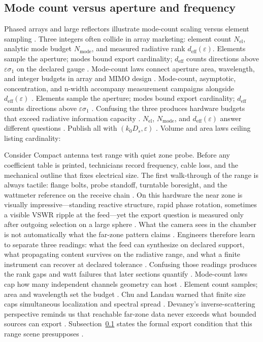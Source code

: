 \subsection{Mode count versus aperture and frequency}
\label{sec:ch481}
Phased arrays and large reflectors illustrate mode-count scaling versus element sampling \cite{collin2001}.
Three integers often collide in array marketing: element count $N_{\mathrm{el}}$, analytic mode budget $N_{\mathrm{mode}}$, and measured radiative rank $d_{\mathrm{eff}}(\varepsilon)$. Elements sample the aperture; modes bound export cardinality; $d_{\mathrm{eff}}$ counts directions above $\varepsilon\sigma_{1}$ on the declared gauge \cite{collin2001}.
Mode-count laws connect aperture area, wavelength, and integer budgets in array and MIMO design \cite{collin2001}.
Mode-count, asymptotic, concentration, and n-width accompany measurement campaigns alongside $d_{\mathrm{eff}}(\varepsilon)$ \cite{landau1962}.
\medskip
 Elements sample the aperture; modes bound export cardinality; \(d_{\mathrm{eff}}\) counts directions above \(\varepsilon\sigma_{1}\) \cite{collin2001}. Confusing the three produces hardware budgets that exceed radiative information capacity \cite{devaney2004}.
$N_{\mathrm{el}}$, $N_{\mathrm{mode}}$, and $d_{\mathrm{eff}}(\varepsilon)$ answer different questions \cite{collin2001}. Publish all with $(k_0 D_s,\varepsilon)$ \cite{devaney2004}.
\medskip
Volume and area laws ceiling listing cardinality:
\begin{physicalvignette}
Consider Compact antenna test range with quiet zone probe. Before any coefficient table is printed, technicians record frequency, cable loss, and the mechanical outline that fixes electrical size. The first walk-through of the range is always tactile: flange bolts, probe standoff, turntable boresight, and the wattmeter reference on the receive chain \cite{hansen1988}.
On this hardware the near zone is visually impressive---standing reactive structure, rapid phase rotation, sometimes a visible VSWR ripple at the feed---yet the export question is measured only after outgoing selection on a large sphere \cite{harrington2001}. What the camera sees in the chamber is not automatically what the far-zone pattern claims \cite{stratton1941}.
Engineers therefore learn to separate three readings: what the feed can synthesize on declared support, what propagating content survives on the radiative range, and what a finite instrument can recover at declared tolerance \cite{devaney2004}. Confusing those readings produces the rank gaps and watt failures that later sections quantify \cite{pal2026}.
Mode-count laws cap how many independent channels geometry can host . Element count samples; area and wavelength set the budget .
Chu and Landau warned that finite size caps simultaneous localization and spectral spread \cite{chu1948}. Devaney's inverse-scattering perspective reminds us that reachable far-zone data never exceeds what bounded sources can export \cite{devaney2004}.
Subsection~\ref{sec:ch481} states the formal export condition that this range scene presupposes \cite{stratton1941}.
\end{physicalvignette}
